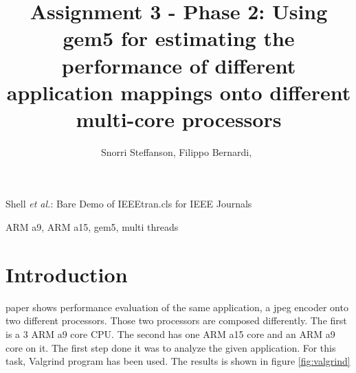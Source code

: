 \documentclass[journal]{IEEEtran}
\begin{document}
\title{Assignment 3 - Phase 2: Using gem5 for estimating the performance of different application mappings onto different multi-core processors
}

\author{Snorri Steffanson, Filippo Bernardi,~
}



%
{Shell \MakeLowercase{\textit{et al.}}: Bare Demo of IEEEtran.cls for IEEE Journals}


\maketitle

\begin{abstract}

\end{abstract}

\begin{IEEEkeywords}
ARM a9, ARM a15, gem5, multi threads 
\end{IEEEkeywords}




\IEEEpeerreviewmaketitle



\section{Introduction}

 paper shows performance evaluation of the same application, a jpeg encoder onto two different processors. Those two processors are composed differently. The first is a 3 ARM a9 core CPU. The second has one ARM a15 core and an ARM a9 core on it.
The first step done it was to analyze the given application. For this task, Valgrind program has been used.
The results is shown in figure \ref{fig:valgrind}
\end{document}
